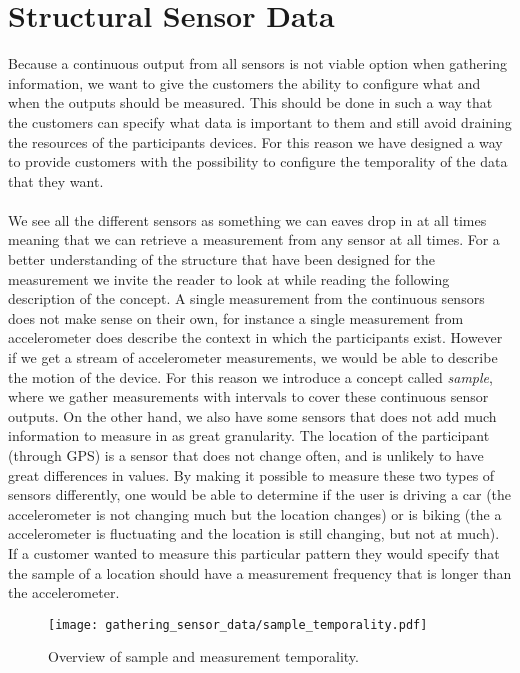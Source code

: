 \section{Structural Sensor Data}
\label{sec:structural_sensor_data}
Because a continuous output from all sensors is not viable option when gathering information, we want to give the customers the ability to configure what and when the outputs should be measured. This should be done in such a way that the customers can specify what data is important to them and still avoid draining the resources of the participants devices. For this reason we have designed a way to provide customers with the possibility to configure the temporality of the data that they want. 
\\\\
We see all the different sensors as something we can eaves drop in at all times meaning that we can retrieve a measurement from any sensor at all times. For a better understanding of the structure that have been designed for the measurement we invite the reader to look at  while reading the following description of the concept. A single measurement from the continuous sensors does not make sense on their own, for instance a single measurement from accelerometer does describe the context in which the participants exist. However if we get a stream of accelerometer measurements, we would be able to describe the motion of the device. For this reason we introduce a concept called \emph{sample}, where we gather measurements with intervals to cover these continuous sensor outputs. On the other hand, we also have some sensors that does not add much information to measure in as great granularity. The location of the participant (through GPS) is a sensor that does not change often, and is unlikely to have great differences in values. By making it possible to measure these two types of sensors differently, one would be able to determine if the user is driving a car (the accelerometer is not changing much but the location changes) or is biking (the a accelerometer is fluctuating and the location is still changing, but not at much). If a customer wanted to measure this particular pattern they would specify that the sample of a location should have a measurement frequency that is longer than the accelerometer.

\begin{figure}[!htbp]
    \centering
    \texttt{[image: gathering\_sensor\_data/sample\_temporality.pdf]}
    \caption{Overview of sample and measurement temporality.}
    \label{fig:sample_temporality}
\end{figure}
\FloatBarrier

